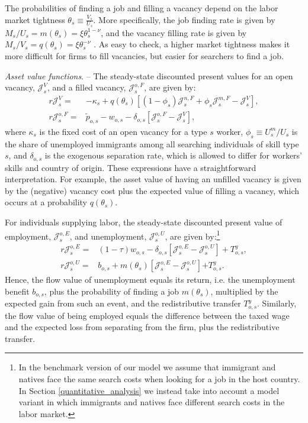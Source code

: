 \documentclass[a4paper,12pt]{article}
\begin{document}
The probabilities of finding a job and filling a vacancy depend on the labor
market tightness $\theta_s \equiv \frac{V_s}{U_s}$. More specifically, the
job finding rate is given by $M_s/U_s=m(\theta_s)=\xi \theta_s^{1-\nu}$, and
the vacancy filling rate is given by $M_s/V_s=q(\theta_s)=\xi \theta_s^{-\nu}$%
. As easy to check, a higher market tightness makes it more difficult
for firms to fill vacancies, but easier for searchers to find a job.


\emph{Asset value functions}. --
The steady-state discounted present values for an open vacancy, $\mathcal{J}%
_{s}^{V}$, and a filled vacancy, $\mathcal{J}_{s}^{o,F}$, are given by: 
\begin{align}
r\mathcal{J}_{s}^{V}=& -\kappa _{s}+q(\theta _{s})\left[ \left( 1-\phi
_{s}\right) \mathcal{J}_{s}^{n,F}+\phi _{s}\mathcal{J}_{s}^{m,F}-\mathcal{J}%
_{s}^{V}\right] ,  \label{Eq:JV} \\
r\mathcal{J}_{s}^{o,F}=& \widetilde{p}_{o,s}-w_{o,s}-\delta _{o,s}\left[ \mathcal{J}%
_{s}^{o,F}-\mathcal{J}_{s}^{V}\right] ,  \label{Eq:JF}
\end{align}%
where $\kappa _{s}$ is the fixed cost of an open vacancy for a type $s$
worker, $\phi _{s}\equiv U_{s}^{m}/U_{s}$ is the share of unemployed
immigrants among all searching individuals of skill type $s$, and $\delta
_{o,s}$ is the exogenous separation rate, which is allowed to differ for
workers' skills and country of origin. These expressions have a straightforward
interpretation. For example, the asset value of having an unfilled vacancy
is given by the (negative) vacancy cost plus the expected value of filling a
vacancy, which occurs at a probability $q(\theta _{s})$.

For individuals supplying labor, the steady-state discounted present value
of employment, $\mathcal{J}_{s}^{o,E}$, and unemployment, $\mathcal{J}%
_{s}^{o,U}$, are given by:\footnote{In the benchmark version of our model we assume that immigrant and natives face the same search costs when looking for a job in the host country. In Section \ref{quantitative_analysis} we instead take into account a model variant in which immigrants and natives face different search costs in the labor market. } 
\begin{align}
r\mathcal{J}_{s}^{o,E}=& (1-\tau )w_{o,s}-\delta _{o,s}\left[ \mathcal{J}%
_{s}^{o,E}-\mathcal{J}_{s}^{o,U}\right] +T^y_{o,s} ,  \label{Eq:JE} \\
r\mathcal{J}_{s}^{o,U}=& b_{o,s}+m\left( \theta _{s}\right) \left[ \mathcal{J%
}_{s}^{o,E}-\mathcal{J}_{s}^{o,U}\right]{+T^y_{o,s}} .  \label{Eq:JU}
\end{align}%
Hence, the flow value of unemployment equals its return, i.e. the
unemployment benefit $b_{o,s}$, plus the probability of finding a job $m(\theta_s)$,
multiplied by the expected gain from such an event, and the redistributive transfer $T^y_{o,s}$. Similarly, the flow value
of being employed equals the difference between the taxed wage and the
expected loss from separating from the firm, plus the redistributive transfer.
\end{document}
